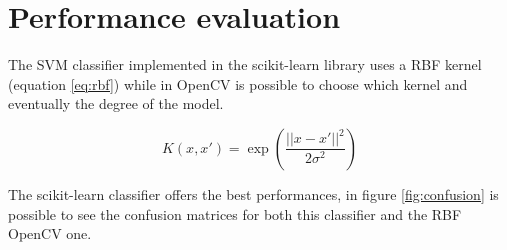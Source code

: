 \section{Performance evaluation}
The SVM classifier implemented in the scikit-learn library uses a RBF kernel (equation \ref{eq:rbf}) while in OpenCV is possible to choose which kernel and eventually the degree of the model. 

\begin{equation} \label{eq:rbf}
    K(x,x') = \exp \left(\frac{||x-x'||^2}{2\sigma^2}\right)
\end{equation}

The scikit-learn classifier offers the best performances, in figure \ref{fig:confusion} is possible to see the confusion matrices for both this classifier and the RBF OpenCV one. 

